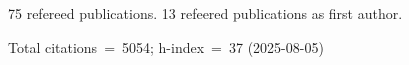 75 refereed publications. 13 refeered publications as first author.

Total citations~=~5054; h-index~=~37 (2025-08-05)
